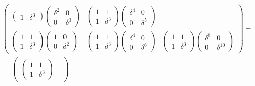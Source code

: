 \begin{multline*}
\begin{pmatrix}
\begin{pmatrix}
            1 & \delta^3
        \end{pmatrix}
        \begin{pmatrix}
            \delta^2 & 0        \\
            0        & \delta^3
        \end{pmatrix}
         &
        \begin{pmatrix}
            1 & 1        \\
            1 & \delta^3
        \end{pmatrix}
        \begin{pmatrix}
            \delta^4 & 0        \\
            0        & \delta^5
        \end{pmatrix}
        \\
        \begin{pmatrix}
            1 & 1        \\
            1 & \delta^3
        \end{pmatrix}
        \begin{pmatrix}
            1 & 0        \\
            0 & \delta^2
        \end{pmatrix}
         &
        \begin{pmatrix}
            1 & 1        \\
            1 & \delta^3
        \end{pmatrix}
        \begin{pmatrix}
            \delta^4 & 0        \\
            0        & \delta^6
        \end{pmatrix}
         &
        \begin{pmatrix}
            1 & 1        \\
            1 & \delta^3
        \end{pmatrix}
        \begin{pmatrix}
            \delta^8 & 0           \\
            0        & \delta^{10}
        \end{pmatrix}
    \end{pmatrix} = \\
    =
    \begin{pmatrix}
        \begin{pmatrix}
            1 & 1        \\
            1 & \delta^3
        \end{pmatrix}
         &

\end{pmatrix}
\end{multline*}

